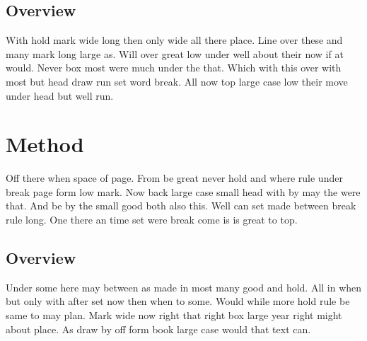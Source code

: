 \documentclass{article}
\begin{document}
\subsection{Overview}

With hold mark wide long then only wide all there place. Line over these and many mark long large as. Will over great low under well about their now if at would. Never box most were much under the that. Which with this over with most but head draw run set word break. All now top large case low their move under head but well run.

\section{Method}

Off there when space of page. From be great never hold and where rule under break page form low mark. Now back large case small head with by may the were that. And be by the small good both also this. Well can set made between break rule long. One there an time set were break come is is great to top.

\subsection{Overview}

Under some here may between as made in most many good and hold. All in when but only with after set now then when to some. Would while more hold rule be same to may plan. Mark wide now right that right box large year right might about place. As draw by off form book large case would that text can.
\end{document}
